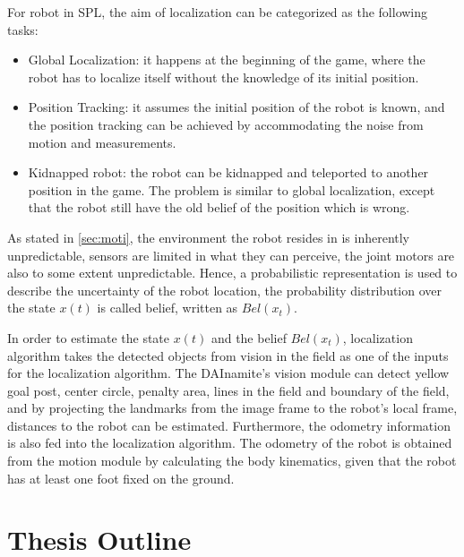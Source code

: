 For robot in \gls{SPL}, the aim of localization can be categorized as the following tasks:
\begin{itemize}
  \item Global Localization: it happens at the beginning of the game, where the robot has to localize itself without the knowledge of its initial position.
  \item Position Tracking: it assumes the initial position of the robot is known, and the position tracking can be achieved by accommodating the noise from motion and measurements.
  \item Kidnapped robot: the robot can be kidnapped and teleported to another position in the game. The problem is similar to global localization, except that the robot still have the old belief of the position which is wrong.
\end{itemize}
As stated in \autoref{sec:moti}, the environment the robot resides in is inherently unpredictable, sensors are limited in what they can perceive, the joint motors are also to some extent unpredictable. Hence, a probabilistic representation is used to describe the uncertainty of the robot location, the probability distribution over the state $x(t)$ is called belief, written as $Bel(x_{t})$.

In order to estimate the state $x(t)$ and the belief $Bel(x_{t})$, localization algorithm takes the detected objects from vision in the field as one of the inputs for the localization algorithm. The DAInamite's vision module can detect yellow goal post, center circle, penalty area, lines in the field and boundary of the field, and by projecting the landmarks from the image frame to the robot's local frame, distances to the robot can be estimated. Furthermore, the odometry information is also fed into the localization algorithm. The odometry of the robot is obtained from the motion module by calculating the body kinematics, given that the robot has at least one foot fixed on the ground. 


\section{Thesis Outline\label{sec:outline}}

